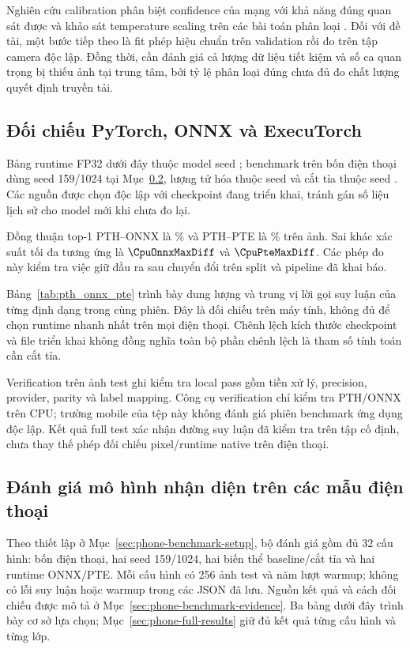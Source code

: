 Nghiên cứu calibration phân biệt confidence của mạng với khả năng đúng quan sát được và khảo sát temperature scaling trên các bài toán phân loại \citep{guo2017calibration}. Đối với đề tài, một bước tiếp theo là fit phép hiệu chuẩn trên validation rồi đo trên tập camera độc lập. Đồng thời, cần đánh giá cả lượng dữ liệu tiết kiệm và số ca quan trọng bị thiếu ảnh tại trung tâm, bởi tỷ lệ phân loại đúng chưa đủ đo chất lượng quyết định truyền tải.

\subsection{Đối chiếu PyTorch, ONNX và ExecuTorch}
Bảng runtime FP32 dưới đây thuộc model seed \BenchmarkSeed{}; benchmark trên bốn điện thoại dùng seed 159/1024 tại Mục~\ref{sec:phone-benchmark-results}, lượng tử hóa thuộc seed \QuantizationSeed{} và cắt tỉa thuộc seed \PruningSeed{}. Các nguồn được chọn độc lập với checkpoint đang triển khai, tránh gán số liệu lịch sử cho model mới khi chưa đo lại.



Đồng thuận top-1 PTH--ONNX là \CpuOnnxAgreement\% và PTH--PTE là \CpuPteAgreement\% trên \ImageTest{} ảnh. Sai khác xác suất tối đa tương ứng là $\CpuOnnxMaxDiff$ và $\CpuPteMaxDiff$. Các phép đo này kiểm tra việc giữ đầu ra sau chuyển đổi trên split và pipeline đã khai báo.

Bảng~\ref{tab:pth_onnx_pte} trình bày dung lượng và trung vị lời gọi suy luận của từng định dạng trong cùng phiên. Đây là đối chiếu trên máy tính, không đủ để chọn runtime nhanh nhất trên mọi điện thoại. Chênh lệch kích thước checkpoint và file triển khai không đồng nghĩa toàn bộ phần chênh lệch là tham số tính toán cần cắt tỉa.

Verification trên \VerificationSamples{} ảnh test ghi \VerificationPassedChecks{} kiểm tra local pass gồm tiền xử lý, precision, provider, parity và label mapping. Công cụ verification chỉ kiểm tra PTH/ONNX trên CPU; trường mobile của tệp này không đánh giá phiên benchmark ứng dụng độc lập. Kết quả full test xác nhận đường suy luận đã kiểm tra trên tập cố định, chưa thay thế phép đối chiếu pixel/runtime native trên điện thoại.

\subsection{Đánh giá mô hình nhận diện trên các mẫu điện thoại}\label{sec:phone-benchmark-results}
Theo thiết lập ở Mục~\ref{sec:phone-benchmark-setup}, bộ đánh giá gồm đủ 32 cấu hình: bốn điện thoại, hai seed 159/1024, hai biến thể baseline/cắt tỉa và hai runtime ONNX/PTE. Mỗi cấu hình có 256 ảnh test và năm lượt warmup; không có lỗi suy luận hoặc warmup trong các JSON đã lưu. Nguồn kết quả và cách đối chiếu được mô tả ở Mục~\ref{sec:phone-benchmark-evidence}. Ba bảng dưới đây trình bày cơ sở lựa chọn; Mục~\ref{sec:phone-full-results} giữ đủ kết quả từng cấu hình và từng lớp.

